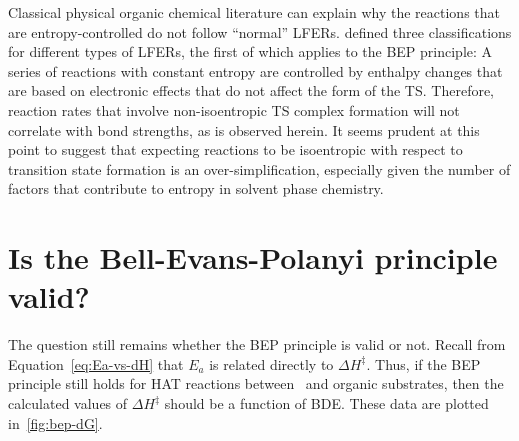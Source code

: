 Classical physical organic chemical literature can explain why the reactions
that are entropy-controlled do not follow ``normal'' LFERs.\cite{Exner1973}
\citet{Blackadder1958} defined three classifications for different types of
LFERs, the first of which applies to the BEP principle: A series of reactions
with constant entropy are controlled by enthalpy changes that are based on
electronic effects that do not affect the form of the TS. Therefore, reaction
rates that involve non-isoentropic TS complex formation will not correlate with
bond strengths, as is observed herein. It seems prudent at this point to
suggest that expecting reactions to be isoentropic with respect to transition
state formation is an over-simplification, especially given the number of
factors that contribute to entropy in solvent phase chemistry.

\section{Is the Bell-Evans-Polanyi principle valid?}

The question still remains whether the BEP principle is valid or not. Recall
from Equation~\ref{eq:Ea-vs-dH} that $E_a$ is related directly to $\Delta
H^\ddagger$. Thus, if the BEP principle still holds for HAT reactions between
\cumo\ and organic substrates, then the calculated values of $\Delta
H^\ddagger$ should be a function of  BDE. These data are plotted
in~\ref{fig:bep-dG}.

